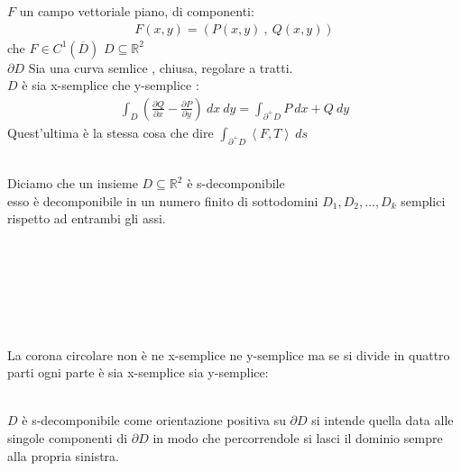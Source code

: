 \documentclass[a4paper, oneside]{article}
\begin{document}
\begin{lemma}
   $F$ un campo vettoriale piano, di componenti:
  \begin{gather*}
    F(x,y) = \left( P(x,y) \ , \ Q(x,y) \right)
  \end{gather*}
   che $F \in C^1 (\overline{D})$ 
   $D \subseteq \mathbb{R}^2$\\ 
   $\partial D$ Sia una curva semlice , chiusa, regolare a tratti.\\
   $D$ è sia x-semplice che y-semplice :
  \begin{gather*}
    \int_D \left( \frac{\partial Q}{\partial x} - \frac{\partial P}{\partial y} \right) \ dx \ dy = \int_{\partial^+ D} P \ dx + Q \ dy
  \end{gather*}  
  Quest'ultima è la stessa cosa che dire $\int_{\partial^+ D} \left\langle F,T \right\rangle \ ds $
\end{lemma}
\hfill\\
Diciamo che un insieme $D\subseteq \mathbb{R}^2$ è s-decomponibile\\
 esso è decomponibile in un numero finito di sottodomini $D_1, D_2, \dots , D_k$ semplici rispetto ad entrambi gli assi.
\hfill\\\hfill\\\hfill\\\hfill\\\hfill\\\hfill\\\hfill\\
\begin{example}
  La corona circolare non è ne x-semplice ne y-semplice ma se si divide in quattro parti ogni parte è sia x-semplice sia y-semplice:
  \begin{center}
  \end{center}
\end{example}
\hfill\\
 $D$ è s-decomponibile come orientazione positiva su $\partial D$ si intende quella data alle singole componenti di $\partial D$ in modo che percorrendole si lasci il dominio sempre alla propria sinistra.\\
\end{document}
